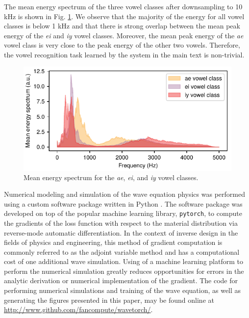 The mean energy spectrum of the three vowel classes after downsampling to 10 kHz is shown in Fig. \ref{fig:s_spectrum}.
We observe that the majority of the energy for all vowel classes is below 1 kHz and that there is strong overlap between the mean peak energy of the \textit{ei} and \textit{iy} vowel classes.
Moreover, the mean peak energy of the \textit{ae} vowel class is very close to the peak energy of the other two vowels.
Therefore, the vowel recognition task learned by the system in the main text is non-trivial.

\begin{figure}[t]
  \centering
  \includegraphics{figures/insitu_spectrum}
  \caption{Mean energy spectrum for the \textit{ae}, \textit{ei}, and \textit{iy} vowel classes.}
  \label{fig:s_spectrum}
\end{figure}

Numerical modeling and simulation of the wave equation physics was performed using a custom software package written in Python \cite{wavetorch}.
The software package was developed on top of the popular machine learning library, \texttt{pytorch}, to compute the gradients of the loss function with respect to the material distribution via reverse-mode automatic differentiation.
In the context of inverse design in the fields of physics and engineering, this method of gradient computation is commonly referred to as the adjoint variable method and has a computational cost of one additional wave simulation.
Using of a machine learning platform to perform the numerical simulation greatly reduces opportunities for errors in the analytic derivation or numerical implementation of the gradient. The code for performing numerical simulations and training of the wave equation, as well as generating the figures presented in this paper, may be found online at \url{http://www.github.com/fancompute/wavetorch/}.

